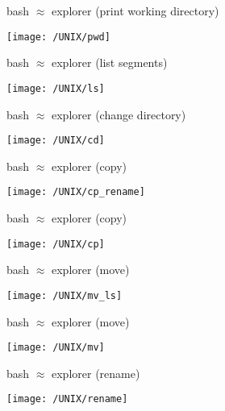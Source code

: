 \documentclass[xcolor=dvipsnames]{beamer}
\begin{document}
\begin{frame}
	bash $\approx$ explorer (print working directory)
	\begin{center}
		\texttt{[image: /UNIX/pwd]}
	\end{center}
\end{frame}

\begin{frame}
	bash $\approx$ explorer (list segments)
	\begin{center}
		\texttt{[image: /UNIX/ls]}
	\end{center}
\end{frame}

\begin{frame}
	bash $\approx$ explorer (change directory)
	\begin{center}
		\texttt{[image: /UNIX/cd]}
	\end{center}
\end{frame}
		

\begin{frame}
	bash $\approx$ explorer (copy)
	\begin{center}
		\texttt{[image: /UNIX/cp\_rename]}
	\end{center}
\end{frame}

\begin{frame}
	bash $\approx$ explorer (copy)
	\begin{center}
		\texttt{[image: /UNIX/cp]}
	\end{center}
\end{frame}

\begin{frame}
	bash $\approx$ explorer (move)
	\begin{center}
		\texttt{[image: /UNIX/mv\_ls]}
	\end{center}
\end{frame}

\begin{frame}
	bash $\approx$ explorer (move)
	\begin{center}
		\texttt{[image: /UNIX/mv]}
	\end{center}
\end{frame}

\begin{frame}
	bash $\approx$ explorer (rename)
	\begin{center}
		\texttt{[image: /UNIX/rename]}
	\end{center}
\end{frame}
\end{document}
